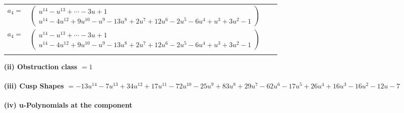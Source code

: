 \documentclass[1p]{elsarticle_modified}
\theoremstyle{definition}
\begin{document}
\begin{tabular}{m{7pt} m{180pt} m{7pt} m{180pt} }
\flushright $a_{4}=$&$\begin{pmatrix}u^{14}- u^{13}+\cdots-3 u+1\\u^{14}-4 u^{12}+9 u^{10}- u^9-13 u^8+2 u^7+12 u^6-2 u^5-6 u^4+u^3+3 u^2-1\end{pmatrix}$\\ \flushright $a_{4}=$&$\begin{pmatrix}u^{14}- u^{13}+\cdots-3 u+1\\u^{14}-4 u^{12}+9 u^{10}- u^9-13 u^8+2 u^7+12 u^6-2 u^5-6 u^4+u^3+3 u^2-1\end{pmatrix}$\\&\end{tabular}
\flushleft \textbf{(ii) Obstruction class $= 1$}\\~\\
\flushleft \textbf{(iii) Cusp Shapes $= -13 u^{14}-7 u^{13}+34 u^{12}+17 u^{11}-72 u^{10}-25 u^9+83 u^8+29 u^7-62 u^6-17 u^5+26 u^4+16 u^3-16 u^2-12 u-7$}\\~\\
\newpage\renewcommand{\arraystretch}{1}
\flushleft \textbf{(iv) u-Polynomials at the component}\newline \\
\end{document}
